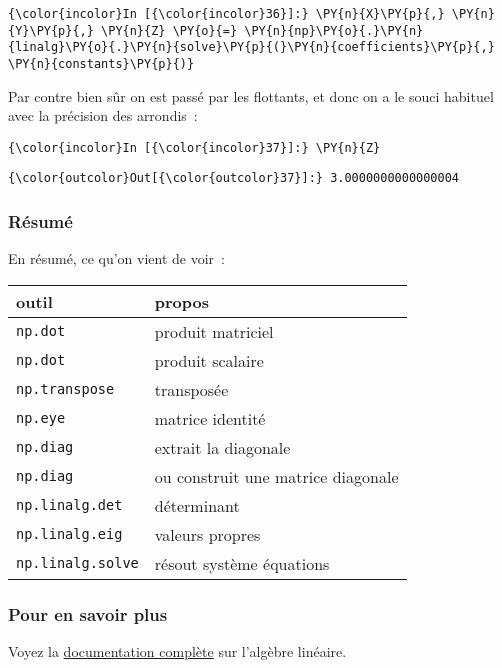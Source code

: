     \begin{Verbatim}[commandchars=\\\{\}]
{\color{incolor}In [{\color{incolor}36}]:} \PY{n}{X}\PY{p}{,} \PY{n}{Y}\PY{p}{,} \PY{n}{Z} \PY{o}{=} \PY{n}{np}\PY{o}{.}\PY{n}{linalg}\PY{o}{.}\PY{n}{solve}\PY{p}{(}\PY{n}{coefficients}\PY{p}{,} \PY{n}{constants}\PY{p}{)}
\end{Verbatim}


    Par contre bien sûr on est passé par les flottants, et donc on a le
souci habituel avec la précision des arrondis~:

    \begin{Verbatim}[commandchars=\\\{\}]
{\color{incolor}In [{\color{incolor}37}]:} \PY{n}{Z}
\end{Verbatim}


\begin{Verbatim}[commandchars=\\\{\}]
{\color{outcolor}Out[{\color{outcolor}37}]:} 3.0000000000000004
\end{Verbatim}
            
    \hypertarget{ruxe9sumuxe9}{%
\subsubsection{Résumé}\label{ruxe9sumuxe9}}

    En résumé, ce qu'on vient de voir~:

    \begin{longtable}[]{@{}ll@{}}
\toprule
outil & propos\tabularnewline
\midrule
\endhead
\texttt{np.dot} & produit matriciel\tabularnewline
\texttt{np.dot} & produit scalaire\tabularnewline
\texttt{np.transpose} & transposée\tabularnewline
\texttt{np.eye} & matrice identité\tabularnewline
\texttt{np.diag} & extrait la diagonale\tabularnewline
\texttt{np.diag} & ou construit une matrice diagonale\tabularnewline
\texttt{np.linalg.det} & déterminant\tabularnewline
\texttt{np.linalg.eig} & valeurs propres\tabularnewline
\texttt{np.linalg.solve} & résout système équations\tabularnewline
\bottomrule
\end{longtable}

    \hypertarget{pour-en-savoir-plus}{%
\subsubsection{Pour en savoir plus}\label{pour-en-savoir-plus}}

Voyez la
\href{https://docs.scipy.org/doc/numpy/reference/routines.linalg.html}{documentation
complète} sur l'algèbre linéaire.


    
    
    
